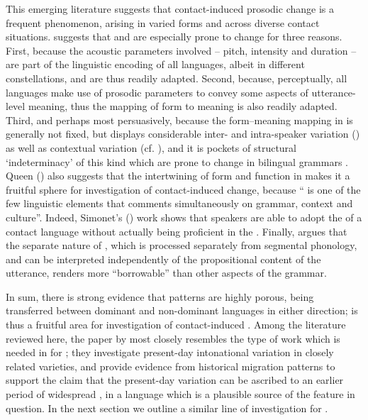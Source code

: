 \documentclass[output=paper]{langsci/langscibook}
\begin{document}
This emerging literature suggests that contact-induced prosodic change is a frequent phenomenon, arising in varied forms and across diverse contact situations. \citet{Bullock2009} suggests that  and  are especially prone to change for three reasons. First, because the acoustic parameters involved -- pitch, intensity and duration -- are part of the linguistic encoding of all languages, albeit in different constellations, and are thus readily adapted. Second, because, perceptually, all languages make use of prosodic parameters to convey some aspects of utterance-level meaning, thus the mapping of form to meaning is also readily adapted. Third, and perhaps most persuasively, because the form--meaning mapping in  is generally not fixed, but displays considerable inter- and intra-speaker variation (\citealt{CangemiGriceKrüger2015,CangemiEtAl2016}) as well as contextual variation (cf. \citealt{Walker2014}), and it is pockets of structural ‘indeterminacy’ of this kind which are prone to change in bilingual grammars \citep{Sorace2004}. Queen (\citeyear[57]{Queen2001}) also suggests that the intertwining of form and function in  makes it a fruitful sphere for investigation of contact-induced change, because “ is one of the few linguistic elements that comments simultaneously on grammar, context and culture”. Indeed, Simonet's (\citeyear{Simonet2011}) work shows that speakers are able to adopt the  of a contact language without actually being proficient in the . Finally, \citet{Matras2007borrowability} argues that the separate nature of , which is processed separately from segmental phonology, and can be interpreted independently of the propositional content of the utterance, renders  more ``borrowable'' than other aspects of the grammar. 

In sum, there is strong evidence that  patterns are highly porous, being transferred between dominant and non-dominant languages in either direction;  is thus a fruitful area for investigation of contact-induced . Among the literature reviewed here, the paper by \citet{ColantoniGurlekian2004} most closely resembles the type of work which is needed in  for ; they investigate present-day intonational variation in closely related varieties, and provide evidence from historical migration patterns to support the claim that the present-day variation can be ascribed to an earlier period of widespread , in a language which is a plausible source of the feature in question. In the next section we outline a similar line of investigation for .
\end{document}

